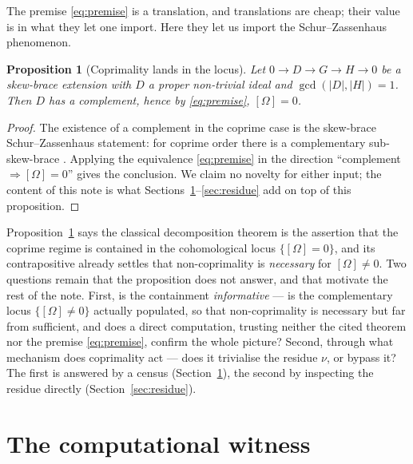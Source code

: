 \documentclass[11pt]{article}
\newtheorem{proposition}[theorem]{Proposition}
\theoremstyle{definition}
\newcommand{\gcdd}{\gcd}
\begin{document}
The premise \eqref{eq:premise} is a translation, and translations are cheap; their value is
in what they let one import. Here they let us import the Schur--Zassenhaus phenomenon.

\begin{proposition}[Coprimality lands in the locus]\label{prop:locus}
Let $0\to D\to G\to H\to 0$ be a skew-brace extension with $D$ a proper non-trivial ideal
and $\gcdd(|D|,|H|)=1$. Then $D$ has a complement, hence by \eqref{eq:premise},
$[\Omega]=0$.
\end{proposition}

\begin{proof}
The existence of a complement in the coprime case is the skew-brace Schur--Zassenhaus
statement: for coprime order there is a complementary sub-skew-brace \cite{RY}. Applying the
equivalence \eqref{eq:premise} in the direction ``complement $\Rightarrow[\Omega]=0$'' gives
the conclusion. We claim no novelty for either input; the content of this note is what
Sections~\ref{sec:witness}--\ref{sec:residue} add on top of this proposition.
\end{proof}

Proposition~\ref{prop:locus} says the classical decomposition theorem is the assertion that
the coprime regime is contained in the cohomological locus $\{[\Omega]=0\}$, and its
contrapositive already settles that non-coprimality is \emph{necessary} for $[\Omega]\ne0$.
Two questions remain that the proposition does not answer, and that motivate the rest of the
note. First, is the containment \emph{informative} --- is the complementary locus
$\{[\Omega]\ne0\}$ actually populated, so that non-coprimality is necessary but far from
sufficient, and does a direct computation, trusting neither the cited theorem nor the premise
\eqref{eq:premise}, confirm the whole picture? Second, through what mechanism does coprimality
act --- does it trivialise the residue $\nu$, or bypass it? The first is answered by a census
(Section~\ref{sec:witness}), the second by inspecting the residue directly
(Section~\ref{sec:residue}).

\section{The computational witness}\label{sec:witness}
\end{document}
